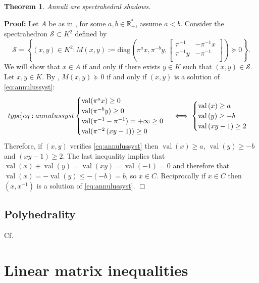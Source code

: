 \documentclass[a4paper,12pt]{article}
\newenvironment{proof}{\hbox{}\vspace{-0.8cm} {\bf Proof:}}{\hfill $\Box$}
\newtheorem{theorem}{Theorem}[section]
\newcommand{\R}{\mathbb{R}} %
\DeclareMathOperator{\val}{val}
\def\diag{\mathrm{diag}}
\begin{document}
\begin{theorem}
Annuli are spectrahedral shadows.
\end{theorem} 
\begin{proof}
  Let $A$ be as in , for some $a,b \in \R^*_+$, assume $a<b$. Consider the spectrahedron
  $\mathcal{S} \subset K^2$ defined by
  $$
  \mathcal{S}= \left\{(x,y) \in K^2 : M(x,y) := \diag\left(\pi^ax, \pi^{-b}y, \begin{bmatrix} \pi^{-1} & -\pi^{-1}x \\ \pi^{-1}y & - \pi^{-1}  \\ \end{bmatrix}\right) \succeq 0\right\}.
  $$
We will show that $x \in A$ if and only if  there exists $y\in K$ such that $(x,y) \in \mathcal{S}$.
Let $x,y \in K$. By , $M(x,y) \succeq 0$ if and only if $(x,y)$ is a solution of
\eqref{eq:annulussyst}:
\begin{equation}
  \label[type]{eq:annulussyst}
\begin{cases}
  \val(\pi^ax) \ge 0 \\
  \val(\pi^{-b}y) \ge 0\\
  \val(\pi^{-1}- \pi^{-1}) = +\infty \ge 0\\
  \val(\pi^{-2}\left( xy-1 \right))  \ge 0 
\end{cases}
\iff	
\begin{cases} 
		\val\left(x\right)\ge a\\
		\val\left(y\right)\ge -b\\
		\val\left( xy-1 \right) \ge 2
	\end{cases}
\end{equation}
Therefore, if $(x, y)$ verifies \eqref{eq:annulussyst} then $\val\left(x\right)\ge a$, $\val\left(y\right)\ge -b$ and $ \left( xy-1 \right) \ge 2$. The last inequality implies that $\val\left(x\right)+\val\left(y\right)=\val\left(xy\right) = \val\left(-1\right) =0$ and therefore that $\val\left(x\right)=-\val\left(y\right)\le -(-b)  =b$, so $x \in C$. 
Reciprocally if $x \in C$ then $(x,x^{-1}) $ is a solution of \eqref{eq:annulussyst}.
\end{proof}

\subsection{Polyhedrality}
Cf. \cite{bhardwaj2015deciding}

\section{Linear matrix inequalities}
\end{document}
